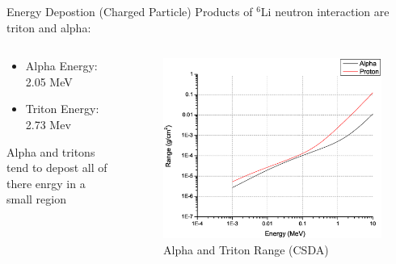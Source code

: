 \begin{frame}{Energy Depostion (Charged Particle)}
Products of ${}^6$Li neutron interaction are triton and alpha:
\begin{columns}[onlytextwidth]
\begin{column}{0.45\textwidth}
\begin{itemize}
	\small
	\item Alpha Energy: 2.05 MeV
	\item Triton Energy: 2.73 Mev
\end{itemize}
Alpha and tritons tend to depost all of there enrgy in a small region
\end{column}
\begin{column}{0.45\textwidth}
	\begin{figure}
	\includegraphics[width=\textwidth]{images/PStarAStarRange.eps}
	\caption{Alpha and Triton Range (CSDA) \protect \cite{berger_estar_2005}}
	\label{fig:PStarAStarRange}
	\end{figure}
\end{column}
\end{columns}
\end{frame}

